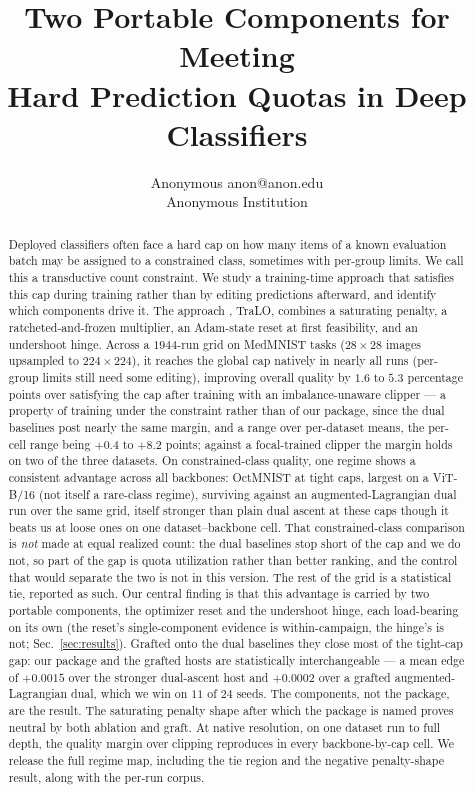 \documentclass[10pt]{article}
\title{Two Portable Components for Meeting\\
Hard Prediction Quotas in Deep Classifiers}
\author{\name Anonymous \email anon@anon.edu \\
      \addr Anonymous Institution}
\begin{document}
\maketitle

\begin{abstract}
Deployed classifiers often face a hard cap on how many items of a known
evaluation batch may be assigned to a constrained class{, sometimes with per-group limits.} We call this a transductive count constraint. We study
a training-time approach that satisfies this cap {during training rather than by editing
predictions afterward}, and {identify which components drive it}. The approach%
{, TraLO,} combines a
saturating penalty, a ratcheted-and-frozen multiplier, an Adam-state
reset at first feasibility, and an undershoot hinge. Across a $1944$-run
grid on MedMNIST {tasks} ($28{\times}28$ images upsampled to
$224{\times}224$), {it reaches} the {global} cap natively in
nearly all runs{ (per-group limits still need some editing)}, improving {overall quality} by $1.6$ to
$5.3$ percentage points over satisfying the cap after training
{with an imbalance-unaware clipper --- a property of training under
the constraint rather than of our package, since the dual baselines post nearly
the same margin, and a range over per-dataset means, the per-cell range being
$+0.4$ to $+8.2$ points; against a {focal-trained clipper} the margin holds on two of the three datasets}. {On constrained-class quality, one} regime shows a consistent
advantage across all {backbones}: OctMNIST at tight caps, {largest} on a ViT{-B/16} (not itself a rare-class regime){, {surviving} against an augmented-Lagrangian dual{ run over the same grid,
itself stronger than
plain dual ascent at these caps though it beats} us at loose ones on one
dataset--backbone cell}.
{That constrained-class comparison is \emph{not} made at equal
realized count: the dual baselines stop short of the cap and we do not, so part
of the gap is quota utilization rather than better ranking, and the control that
would separate the two is not in this version.} The rest of
the grid is a statistical tie, reported as such. %
{Our central finding is that this advantage is carried}
by two portable components, the optimizer reset and the undershoot
hinge{, each load-bearing on its own (the reset's single-component
evidence is within-campaign, the hinge's is not; Sec.~\ref{sec:results})}. {Grafted onto the dual baselines they close} most of the tight-cap gap{: our package and the grafted {hosts} are statistically
interchangeable --- a mean edge of $+0.0015$ over the stronger {dual-ascent host and} $+0.0002$ over a grafted augmented-Lagrangian dual, which
we win on $11$ of $24$ seeds. The %
components, not the package, are the result}. {The}
saturating penalty shape after which the package is named proves neutral
by both ablation and graft. 
{At native resolution, on one dataset run to full depth, the
quality margin over clipping reproduces in every backbone-by-cap cell.}
We release the full regime map, including the tie region
and the negative penalty-shape result, along with the per-run corpus.
\end{abstract}
\end{document}
